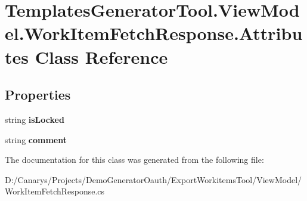 \hypertarget{class_templates_generator_tool_1_1_view_model_1_1_work_item_fetch_response_1_1_attributes}{}\section{Templates\+Generator\+Tool.\+View\+Model.\+Work\+Item\+Fetch\+Response.\+Attributes Class Reference}
\label{class_templates_generator_tool_1_1_view_model_1_1_work_item_fetch_response_1_1_attributes}
\subsection*{Properties}
\begin{DoxyCompactItemize}
\item 
\mbox{\label{class_templates_generator_tool_1_1_view_model_1_1_work_item_fetch_response_1_1_attributes_a3899821a24f7519a9e4e375e978e98cc}} 
string {\bfseries is\+Locked}
\item 
\mbox{\label{class_templates_generator_tool_1_1_view_model_1_1_work_item_fetch_response_1_1_attributes_a0ebaacf76544873b0c4d4375daca56ce}} 
string {\bfseries comment}
\end{DoxyCompactItemize}


The documentation for this class was generated from the following file\+:\begin{DoxyCompactItemize}
\item 
D\+:/\+Canarys/\+Projects/\+Demo\+Generator\+Oauth/\+Export\+Workitems\+Tool/\+View\+Model/Work\+Item\+Fetch\+Response.\+cs\end{DoxyCompactItemize}
